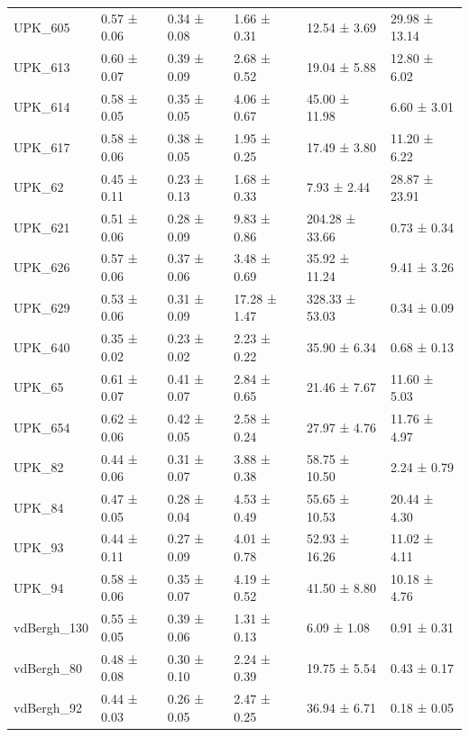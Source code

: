 \begin{tabular}{llllll}
UPK_605 & 0.57 ± 0.06 & 0.34 ± 0.08 & 1.66 ± 0.31 & 12.54 ± 3.69 & 29.98 ± 13.14 \\
UPK_613 & 0.60 ± 0.07 & 0.39 ± 0.09 & 2.68 ± 0.52 & 19.04 ± 5.88 & 12.80 ± 6.02 \\
UPK_614 & 0.58 ± 0.05 & 0.35 ± 0.05 & 4.06 ± 0.67 & 45.00 ± 11.98 & 6.60 ± 3.01 \\
UPK_617 & 0.58 ± 0.06 & 0.38 ± 0.05 & 1.95 ± 0.25 & 17.49 ± 3.80 & 11.20 ± 6.22 \\
UPK_62 & 0.45 ± 0.11 & 0.23 ± 0.13 & 1.68 ± 0.33 & 7.93 ± 2.44 & 28.87 ± 23.91 \\
UPK_621 & 0.51 ± 0.06 & 0.28 ± 0.09 & 9.83 ± 0.86 & 204.28 ± 33.66 & 0.73 ± 0.34 \\
UPK_626 & 0.57 ± 0.06 & 0.37 ± 0.06 & 3.48 ± 0.69 & 35.92 ± 11.24 & 9.41 ± 3.26 \\
UPK_629 & 0.53 ± 0.06 & 0.31 ± 0.09 & 17.28 ± 1.47 & 328.33 ± 53.03 & 0.34 ± 0.09 \\
UPK_640 & 0.35 ± 0.02 & 0.23 ± 0.02 & 2.23 ± 0.22 & 35.90 ± 6.34 & 0.68 ± 0.13 \\
UPK_65 & 0.61 ± 0.07 & 0.41 ± 0.07 & 2.84 ± 0.65 & 21.46 ± 7.67 & 11.60 ± 5.03 \\
UPK_654 & 0.62 ± 0.06 & 0.42 ± 0.05 & 2.58 ± 0.24 & 27.97 ± 4.76 & 11.76 ± 4.97 \\
UPK_82 & 0.44 ± 0.06 & 0.31 ± 0.07 & 3.88 ± 0.38 & 58.75 ± 10.50 & 2.24 ± 0.79 \\
UPK_84 & 0.47 ± 0.05 & 0.28 ± 0.04 & 4.53 ± 0.49 & 55.65 ± 10.53 & 20.44 ± 4.30 \\
UPK_93 & 0.44 ± 0.11 & 0.27 ± 0.09 & 4.01 ± 0.78 & 52.93 ± 16.26 & 11.02 ± 4.11 \\
UPK_94 & 0.58 ± 0.06 & 0.35 ± 0.07 & 4.19 ± 0.52 & 41.50 ± 8.80 & 10.18 ± 4.76 \\
vdBergh_130 & 0.55 ± 0.05 & 0.39 ± 0.06 & 1.31 ± 0.13 & 6.09 ± 1.08 & 0.91 ± 0.31 \\
vdBergh_80 & 0.48 ± 0.08 & 0.30 ± 0.10 & 2.24 ± 0.39 & 19.75 ± 5.54 & 0.43 ± 0.17 \\
vdBergh_92 & 0.44 ± 0.03 & 0.26 ± 0.05 & 2.47 ± 0.25 & 36.94 ± 6.71 & 0.18 ± 0.05 \\
\bottomrule
\end{tabular}
